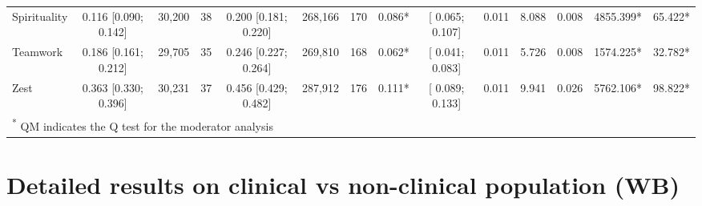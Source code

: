 \documentclass[
  man,floatsintext]{apa6}
\begin{document}
\begin{table}
{\begin{tabular}[t]{lccccccccccccc}
Spirituality & 0.116 [0.090; 0.142] & 30,200 & 38 & 0.200 [0.181; 0.220] & 268,166 & 170 & 0.086* & {}[ 0.065; 0.107] & 0.011 & 8.088 & 0.008 & 4855.399* & 65.422*\\
Teamwork & 0.186 [0.161; 0.212] & 29,705 & 35 & 0.246 [0.227; 0.264] & 269,810 & 168 & 0.062* & {}[ 0.041; 0.083] & 0.011 & 5.726 & 0.008 & 1574.225* & 32.782*\\
Zest & 0.363 [0.330; 0.396] & 30,231 & 37 & 0.456 [0.429; 0.482] & 287,912 & 176 & 0.111* & {}[ 0.089; 0.133] & 0.011 & 9.941 & 0.026 & 5762.106* & 98.822*\\
\bottomrule
\multicolumn{14}{l}{\textsuperscript{*} QM indicates the Q test for the moderator analysis}\\
\end{tabular}}
\end{table}

\newpage

\hypertarget{detailed-results-on-clinical-vs-non-clinical-population-wb}{%
\section{Detailed results on clinical vs non-clinical population (WB)}\label{detailed-results-on-clinical-vs-non-clinical-population-wb}}
\end{document}
